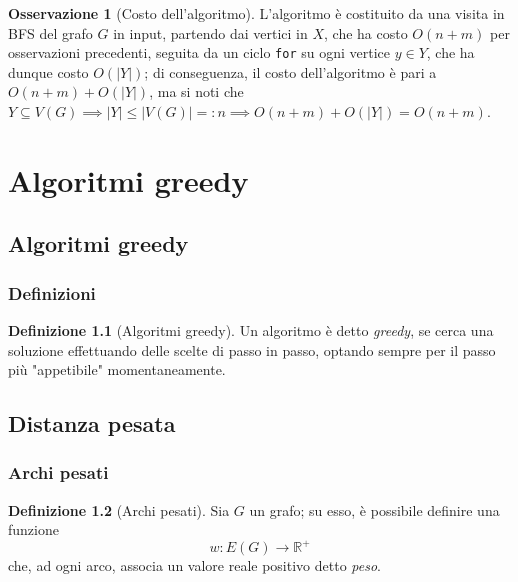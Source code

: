 \documentclass[14pt]{extreport}
\theoremstyle{definition}
\newtheorem{definition}{Definizione}[subsection]
\theoremstyle{definition}
\newtheorem{remark}{Osservazione}[subsection]
\begin{document}
\begin{remark}[Costo dell'algoritmo]
    L'algoritmo è costituito da una visita in BFS del grafo $G$ in input, partendo dai vertici in $X$, che ha costo $O(n + m)$ per osservazioni precedenti, seguita da un ciclo \texttt{for} su ogni vertice $y \in Y$, che ha dunque costo $O(|Y|)$; di conseguenza, il costo dell'algoritmo è pari a $O(n + m) + O(|Y|)$, ma si noti che $Y \subseteq V(G) \implies |Y| \le |V(G)| =: n \implies O(n + m) + O(|Y|) = O(n + m)$.
\end{remark}

\chapter{Algoritmi greedy}

\section{Algoritmi greedy}

\subsection{Definizioni}

\begin{definition}[Algoritmi greedy]
    Un algoritmo è detto \textit{greedy}, se cerca una soluzione effettuando delle scelte di passo in passo, optando sempre per il passo più "appetibile" momentaneamente.
\end{definition}

\section{Distanza pesata}

\subsection{Archi pesati}

\begin{definition}[Archi pesati]
    Sia $G$ un grafo; su esso, è possibile definire una funzione $$w: E(G) \rightarrow \mathbb{R}^+$$ che, ad ogni arco, associa un valore reale positivo detto \textit{peso}.
\end{definition}
\end{document}
